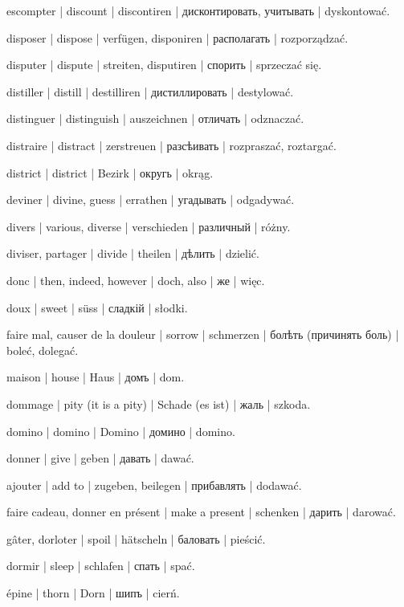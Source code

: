 \begin{outdent}{1em}
escompter | discount | discontiren | дисконтировать,
учитывать | dyskontować.

disposer | dispose | verfügen, disponiren | располагать | rozporządzać.

disputer | dispute | streiten, disputiren | спорить | sprzeczać się.

distiller | distill | destilliren | дистиллировать | destylować.

distinguer | distinguish | auszeichnen | отличать | odznaczać.

distraire | distract | zerstreuen | разсѣивать | rozpraszać,
roztargać.

district | district | Bezirk | округь | okrąg.

deviner | divine, guess | errathen | угадывать | odgadywać.

divers | various, diverse | verschieden | различный | różny.

diviser, partager | divide | theilen | дѣлить | dzielić.

donc | then, indeed, however | doch, also | же | więc.

doux | sweet | süss | сладкій | słodki.

faire mal, causer de la douleur | sorrow | schmerzen | болѣть
(причинять боль) | boleć, dolegać.

maison | house | Haus | домъ | dom.

dommage | pity (it is a pity) | Schade (es ist) | жаль | szkoda.

domino | domino | Domino | домино | domino.

donner | give | geben | давать | dawać.

\uvsubentry{}
ajouter | add to | zugeben, beilegen | прибавлять | dodawać.

faire cadeau, donner en présent | make a present | schenken | дарить | darować.

gâter, dorloter | spoil | hätscheln | баловать | pieścić.

dormir | sleep | schlafen | спать | spać.

épine | thorn | Dorn | шипъ | cierń.


\end{outdent}

